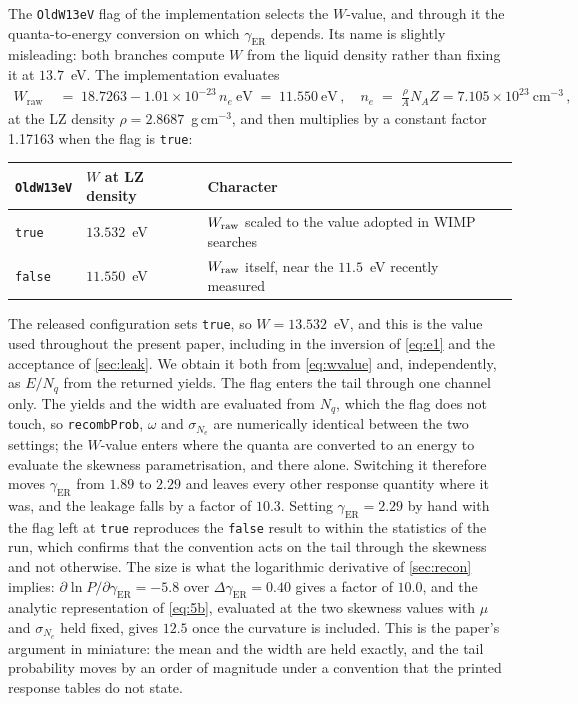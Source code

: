 \documentclass[11pt,a4paper]{article}
\begin{document}
The \texttt{OldW13eV} flag of the implementation selects the
\(W\)-value, and through it the quanta-to-energy conversion on which
\(\gamma_\mathrm{ER}\) depends. Its name is slightly misleading: both
branches compute \(W\) from the liquid density rather than fixing it at
\(13.7\)~eV. The implementation evaluates
\begin{align}
    \label{eq:wvalue}
    W_\mathrm{raw}\;&=\;18.7263-1.01\times10^{-23}\,n_e~\mathrm{eV}\;=\;11.550~\mathrm{eV}\,,\quad 
    n_e\;=\;\frac{\rho}{A}N_{\!A}Z=7.105\times10^{23}~\mathrm{cm^{-3}}\,,
\end{align}
at the LZ density \(\rho=2.8687\)~g\,cm\(^{-3}\), and then multiplies by a constant factor
1.17163 when the flag is \texttt{true}:
\begin{center}
\begin{tabular}{lll}
\toprule
\texttt{OldW13eV} & \(W\) at LZ density & Character\\
\midrule
\texttt{true}  & \(13.532\)~eV & \(W_{\rm raw}\) scaled to the value adopted in WIMP searches\\
\texttt{false} & \(11.550\)~eV & \(W_{\rm raw}\) itself, near the \(11.5\)~eV recently measured~\cite{Recomb}\\
\bottomrule
\end{tabular}
\end{center}
\noindent The released configuration sets \texttt{true}, so
\(W=13.532\)~eV, and this is the value used throughout the present
paper, including in the inversion of \cref{eq:e1} and the
acceptance of \cref{sec:leak}. We obtain it both from
\cref{eq:wvalue} and, independently, as \(E/N_q\) from the returned
yields. The flag enters the tail through one channel only. The yields and the
width are evaluated from \(N_q\), which the flag does not touch, so
\texttt{recombProb}, \(\omega\) and \(\sigma_{N_e}\) are numerically
identical between the two settings; the \(W\)-value enters where the
quanta are converted to an energy to evaluate the skewness
parametrisation, and there alone. Switching it therefore moves
\(\gamma_\mathrm{ER}\) from \(1.89\) to \(2.29\) and leaves every other
response quantity where it was, and the leakage falls by a factor of
\(10.3\). Setting \(\gamma_\mathrm{ER}=2.29\) by hand with the flag left
at \texttt{true} reproduces the \texttt{false} result to within the
statistics of the run, which confirms that the convention acts on the
tail through the skewness and not otherwise. The size is what the
logarithmic derivative of \cref{sec:recon} implies:
\(\partial\ln P/\partial\gamma_\mathrm{ER}=-5.8\) over
\(\Delta\gamma_\mathrm{ER}=0.40\) gives a factor of \(10.0\), and the
analytic representation of \cref{eq:5b}, evaluated at the two skewness
values with \(\mu\) and \(\sigma_{N_e}\) held fixed, gives \(12.5\) once
the curvature is included. This is the paper's argument in miniature:
the mean and the width are held exactly, and the tail probability moves
by an order of magnitude under a convention that the printed response
tables do not state.
\end{document}
